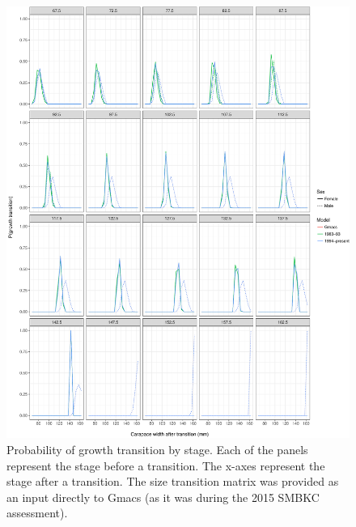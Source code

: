 \documentclass[]{article}
\begin{document}
\begin{figure}[htbp]
\centering
\includegraphics{bbrkc_files/figure-latex/growth_trans-1.pdf}
\caption{Probability of growth transition by stage. Each of the panels
represent the stage before a transition. The x-axes represent the stage
after a transition. The size transition matrix was provided as an input
directly to Gmacs (as it was during the 2015 SMBKC
assessment).\label{fig:growth_trans}}
\end{figure}
\end{document}
